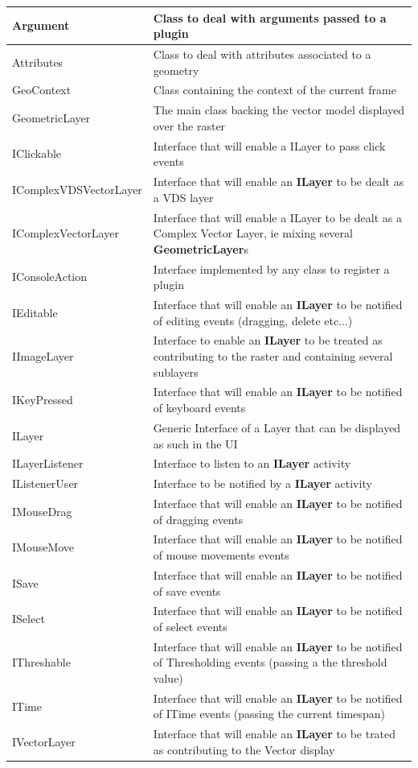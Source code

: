 \documentclass[12pt,a4paper,final,makeidx]{report}
\begin{document}
\begin{tabular}{ | l | p{10cm} | }
\hline
Argument & Class to deal with arguments passed to a plugin \\
\hline
Attributes  & Class to deal with attributes associated to a geometry \\
\hline
GeoContext  & Class containing the context of the current frame \\
\hline
GeometricLayer  & The main class backing the vector model displayed over the raster\\
\hline
IClickable  & Interface that will enable a ILayer to pass click events \\
\hline
IComplexVDSVectorLayer  & Interface that will enable an \textbf{ILayer} to be dealt as a VDS layer \\
\hline
IComplexVectorLayer  &  Interface that will enable a ILayer to be dealt as a Complex Vector Layer, ie mixing several \textbf{GeometricLayer}s \\
\hline
IConsoleAction  & Interface implemented by any class to register a plugin \\
\hline
IEditable  & Interface that will enable an \textbf{ILayer} to be notified of editing events (dragging, delete etc...) \\
\hline
IImageLayer  & Interface to enable an \textbf{ILayer} to be treated as contributing to the raster and containing several sublayers \\
\hline
IKeyPressed  & Interface that will enable an \textbf{ILayer} to be notified of keyboard events \\
\hline
ILayer  & Generic Interface of a Layer that can be displayed as such in the UI \\
\hline
ILayerListener  & Interface to listen to an \textbf{ILayer} activity \\
\hline
IListenerUser  & Interface to be notified by a \textbf{ILayer} activity \\
\hline
IMouseDrag  & Interface that will enable an \textbf{ILayer} to be notified of dragging events \\
\hline
IMouseMove  & Interface that will enable an \textbf{ILayer} to be notified of mouse movements events \\
\hline
ISave  & Interface that will enable an \textbf{ILayer} to be notified of save events \\
\hline
ISelect  & Interface that will enable an \textbf{ILayer} to be notified of select events \\
\hline
IThreshable  & Interface that will enable an \textbf{ILayer} to be notified of Thresholding events (passing a the threshold value) \\
\hline
ITime  & Interface that will enable an \textbf{ILayer} to be notified of ITime events (passing the current timespan) \\
\hline
IVectorLayer  & Interface that will enable an \textbf{ILayer} to be trated as contributing to the Vector display \\
\hline

\end{tabular}
\end{document}
